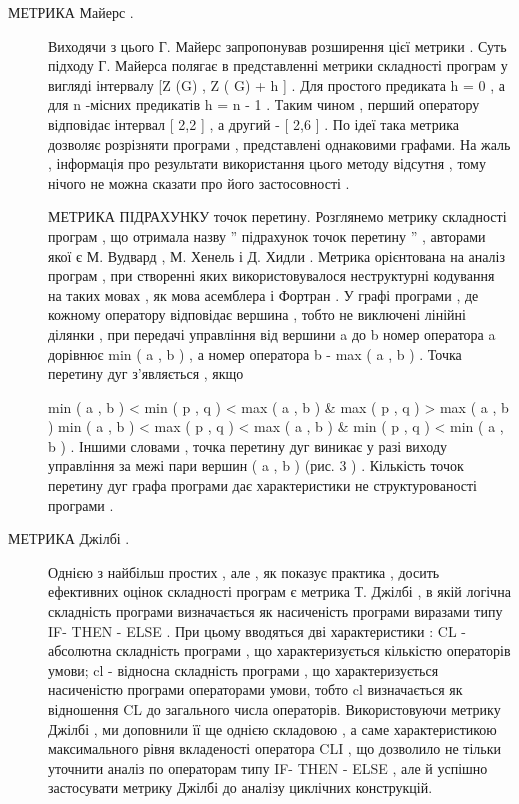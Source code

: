 \begin{description}
\item[{МЕТРИКА Майерс .}] \leavevmode
Виходячи з цього Г. Майерс запропонував розширення цієї метрики . Суть підходу Г. Майерса полягає в представленні метрики складності програм у вигляді інтервалу {[}Z (G) , Z ( G) + h {]} . Для простого предиката h = 0 , а для n -місних предикатів h = n - 1 . Таким чином , перший оператору відповідає інтервал {[} 2,2 {]} , а другий - {[} 2,6 {]} .
По ідеї така метрика дозволяє розрізняти програми , представлені однаковими графами. На жаль , інформація про результати використання цього методу відсутня , тому нічого не можна сказати про його застосовності .

МЕТРИКА ПІДРАХУНКУ точок перетину.
Розглянемо метрику складності програм , що отримала назву '' підрахунок точок перетину '' , авторами якої є М. Вудвард , М. Хенель і Д. Хидли . Метрика орієнтована на аналіз програм , при створенні яких використовувалося неструктурні кодування на таких мовах , як мова асемблера і Фортран .
У графі програми , де кожному оператору відповідає вершина , тобто не виключені лінійні ділянки , при передачі управління від вершини a до b номер оператора a дорівнює min ( a , b ) , а номер оператора b - max ( a , b ) . Точка перетину дуг з'являється , якщо

min ( a , b ) \textless{} min ( p , q ) \textless{} max ( a , b ) \& max ( p , q ) \textgreater{} max ( a , b ) \textbar{}
min ( a , b ) \textless{} max ( p , q ) \textless{} max ( a , b ) \& min ( p , q ) \textless{} min ( a , b ) .
Іншими словами , точка перетину дуг виникає у разі виходу управління за межі пари вершин ( a , b ) (рис. 3 ) .
Кількість точок перетину дуг графа програми дає характеристики не структурованості програми .

\item[{МЕТРИКА Джілбі .}] \leavevmode
Однією з найбільш простих , але , як показує практика , досить ефективних оцінок складності програм є метрика Т. Джілбі , в якій логічна складність програми визначається як насиченість програми виразами типу IF- THEN - ELSE . При цьому вводяться дві характеристики : CL - абсолютна складність програми , що характеризується кількістю операторів умови; cl - відносна складність програми , що характеризується насиченістю програми операторами умови, тобто cl визначається як відношення CL до загального числа операторів.
Використовуючи метрику Джілбі , ми доповнили її ще однією складовою , а саме характеристикою максимального рівня вкладеності оператора CLI , що дозволило не тільки уточнити аналіз по операторам типу IF- THEN - ELSE , але й успішно застосувати метрику Джілбі до аналізу циклічних конструкцій.


\end{description}
